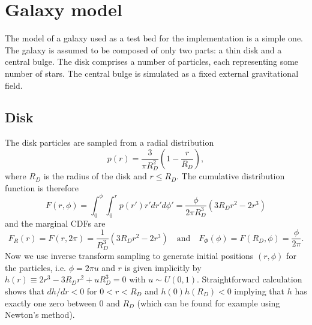 \section{Galaxy model}
The model of a galaxy used as a test bed for the implementation is a simple one.
The galaxy is assumed to be composed of only two parts: a thin disk and a central bulge.
The disk comprises a number of particles, each representing some number of stars.
The central bulge is simulated as a fixed external gravitational field.

\subsection{Disk}
The disk particles are sampled from a radial distribution
\begin{equation*}
    p(r) = \frac{3}{\pi R_D^2}\left(1 - \frac{r}{R_D}\right),
\end{equation*}
where $R_D$ is the radius of the disk and $r \leq R_D$.
The cumulative distribution function is therefore
\begin{equation*}
    F(r, \phi) = \int_{0}^{\phi}\int_{0}^{r} p(r') r'dr'd\phi' = \frac{\phi}{2\pi R_D^3}(3R_D r^2-2r^3)
\end{equation*}
and the marginal CDFs are
\begin{equation*}
    F_R(r) = F(r, 2\pi) = \frac{1}{R_D^3}(3R_D r^2-2r^3) \quad \text{and} \quad F_\Phi(\phi) = F(R_D, \phi) = \frac{\phi}{2\pi}.
\end{equation*}
Now we use inverse transform sampling to generate initial positions $(r, \phi)$ for the particles, i.e. $\phi = 2\pi u$ and $r$ is given implicitly by $h(r) \equiv 2r^3 - 3R_D r^2 + uR_D^3 = 0$ with $u \sim U(0, 1)$.
Straightforward calculation shows that $dh/dr < 0$ for $0 < r < R_D$ and $h(0)h(R_D) < 0$ implying that $h$ has exactly one zero between 0 and $R_D$ (which can be found for example using Newton's method).

